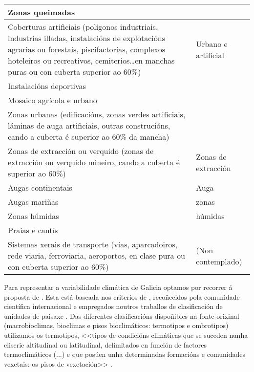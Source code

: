 \documentclass[11pt,a4paper]{article}
\begin{document}
\begin{table}
\begin{center}
\begin{small}
\begin{tabular}{p{}p{}}
Zonas queimadas &  \\
\midrule
Coberturas artificiais (polígonos industriais, industrias illadas, instalacións de explotacións agrarias ou forestais, piscifactorías, complexos hoteleiros ou recreativos, cemiterios\ldots en manchas puras ou con cuberta superior ao 60\%) & Urbano e artificial \\
Instalacións deportivas &  \\
Mosaico agrícola e urbano &  \\
Zonas urbanas (edificacións, zonas verdes artificiais, láminas de auga artificiais, outras construcións, cando a cuberta é superior ao 60\% da mancha) &  \\
\midrule
Zonas de extracción ou verquido (zonas de extracción ou verquido mineiro, cando a cuberta é superior ao 60\%) &  Zonas de extracción\\
\midrule
Augas continentais & Auga \\
Augas mariñas &  zonas \\
Zonas húmidas &  húmidas\\
Praias e cantís &  \\
\midrule
Sistemas xerais de transporte (vías, aparcadoiros, rede viaria, ferroviaria, aeroportos, en clase pura ou con cuberta superior ao 60\%) &  (Non contemplado)\\
\bottomrule
\end{tabular}
\end{small}
\end{center}
\end{table}




Para representar a variabilidade climática de Galicia optamos por recorrer á proposta de \citet{Rodriguez2007}. Esta está baseada nos criterios de \citet{RivasMartinez2015}, recoñecidos pola comunidade científica internacional e empregados noutros traballos de clasificación de unidades de paisaxe \citep[p.ex. ][]{Capotorti2012174}. Das diferentes clasificacións dispoñibles na fonte orixinal (macrobioclimas, bioclimas e pisos bioclimáticos: termotipos e ombrotipos) utilizamos os termotipos, <<tipos de condicións climáticas que se suceden nunha cliserie altitudinal ou latitudinal, delimitados en función de factores termoclimáticos (...) e que posúen unha determinadas formacións e comunidades vexetais: os pisos de vexetación>> \citep{RivasMartinez2015}. 
\end{document}
